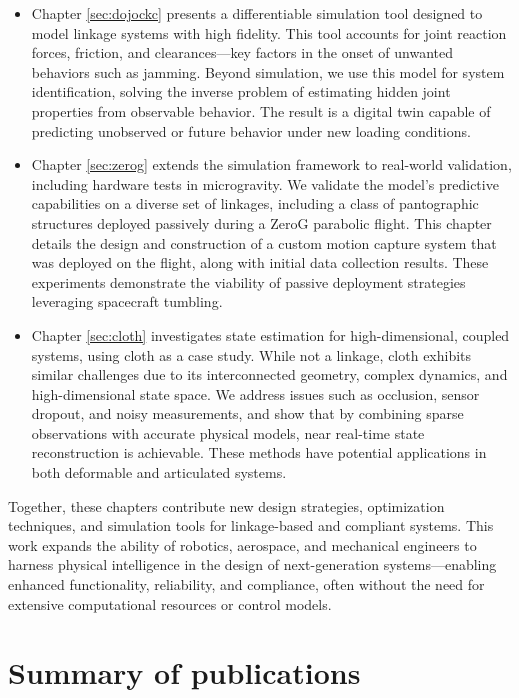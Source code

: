 \begin{itemize}
    \item Chapter \ref{sec:dojockc} presents a differentiable simulation tool designed to model linkage systems with high fidelity. This tool accounts for joint reaction forces, friction, and clearances—key factors in the onset of unwanted behaviors such as jamming. Beyond simulation, we use this model for system identification, solving the inverse problem of estimating hidden joint properties from observable behavior. The result is a digital twin capable of predicting unobserved or future behavior under new loading conditions.
    \item Chapter \ref{sec:zerog} extends the simulation framework to real-world validation, including hardware tests in microgravity. We validate the model’s predictive capabilities on a diverse set of linkages, including a class of pantographic structures deployed passively during a ZeroG parabolic flight. This chapter details the design and construction of a custom motion capture system that was deployed on the flight, along with initial data collection results. These experiments demonstrate the viability of passive deployment strategies leveraging spacecraft tumbling.
    \item Chapter \ref{sec:cloth} investigates state estimation for high-dimensional, coupled systems, using cloth as a case study. While not a linkage, cloth exhibits similar challenges due to its interconnected geometry, complex dynamics, and high-dimensional state space. We address issues such as occlusion, sensor dropout, and noisy measurements, and show that by combining sparse observations with accurate physical models, near real-time state reconstruction is achievable. These methods have potential applications in both deformable and articulated systems.
\end{itemize}

Together, these chapters contribute new design strategies, optimization techniques, and simulation tools for linkage-based and compliant systems. This work expands the ability of robotics, aerospace, and mechanical engineers to harness physical intelligence in the design of next-generation systems—enabling enhanced functionality, reliability, and compliance, often without the need for extensive computational resources or control models.

\newpage
\section{Summary of publications}
\newcommand{\fcite}[1]{
  \begin{leftbar}
  \begin{quote}%
    \citep{#1} \fullcite{#1}
  \end{quote}
  \end{leftbar}}

